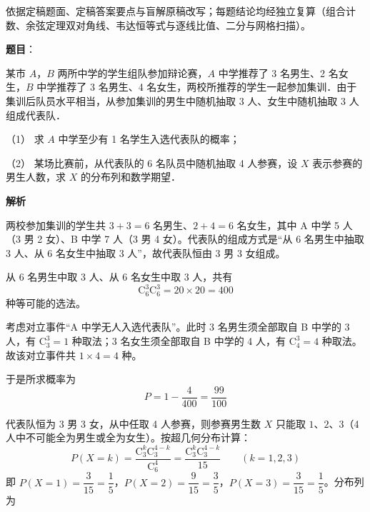 \begin{answer}


\begin{gktip}
依据定稿题面、定稿答案要点与盲解原稿改写；每题结论均经独立复算（组合计数、余弦定理双对角线、韦达恒等式与逐线比值、二分与网格扫描）。
\end{gktip}

\end{answer}
\begin{answer}

\textbf{题目}：

某市 \(A\)，\(B\) 两所中学的学生组队参加辩论赛，\(A\) 中学推荐了 3 名男生、2 名女生，\(B\) 中学推荐了 3 名男生、4 名女生，两校所推荐的学生一起参加集训．由于集训后队员水平相当，从参加集训的男生中随机抽取 3 人、女生中随机抽取 3 人组成代表队．

（1） 求 \(A\) 中学至少有 1 名学生入选代表队的概率；

（2） 某场比赛前，从代表队的 6 名队员中随机抽取 4 人参赛，设 \(X\) 表示参赛的男生人数，求 \(X\) 的分布列和数学期望．

\textbf{解析}

两校参加集训的学生共 \(3+3=6\) 名男生、\(2+4=6\) 名女生，其中 A 中学 5 人（3 男 2 女）、B 中学 7 人（3 男 4 女）。代表队的组成方式是“从 6 名男生中抽取 3 人、从 6 名女生中抽取 3 人”，故代表队恒由 3 男 3 女组成。


从 6 名男生中取 3 人、从 6 名女生中取 3 人，共有
\nopagebreak[4]
\[\mathrm{C}_6^3\mathrm{C}_6^3=20\times20=400\]
种等可能的选法。

考虑对立事件“A 中学无人入选代表队”。此时 3 名男生须全部取自 B 中学的 3 人，有 \(\mathrm{C}_3^3=1\) 种取法；3 名女生须全部取自 B 中学的 4 人，有 \(\mathrm{C}_4^3=4\) 种取法。故该对立事件共 \(1\times4=4\) 种。

于是所求概率为
\nopagebreak[4]
\[P=1-\dfrac{4}{400}=\dfrac{99}{100}\]


代表队恒为 3 男 3 女，从中任取 4 人参赛，则参赛男生数 \(X\) 只能取 \(1\)、\(2\)、\(3\)（4 人中不可能全为男生或全为女生）。按超几何分布计算：
\nopagebreak[4]
\[P(X=k)=\dfrac{\mathrm{C}_3^k\mathrm{C}_3^{4-k}}{\mathrm{C}_6^4}=\dfrac{\mathrm{C}_3^k\mathrm{C}_3^{4-k}}{15}\qquad(k=1,2,3)\]
即 \(P(X=1)=\dfrac{3}{15}=\dfrac15\)，\(P(X=2)=\dfrac{9}{15}=\dfrac35\)，\(P(X=3)=\dfrac{3}{15}=\dfrac15\)。分布列为


\end{answer}

